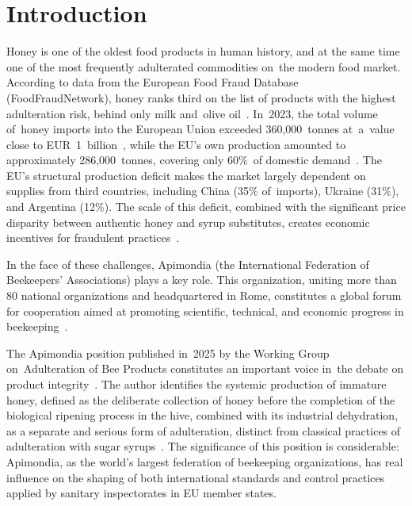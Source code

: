 \documentclass[foods,review,accept,pdftex,moreauthors]{Definitions/mdpi}
\begin{document}
\nolinenumbers


\section{Introduction}

Honey is one of the oldest food products in human history, and at
the same time one of the most frequently adulterated commodities
on~the modern food market. According to data from the European Food
Fraud Database (FoodFraudNetwork), honey ranks third on the list of
products with the highest adulteration risk, behind only milk
and~olive oil~\cite{apimondia_fraud_v2}. In~2023, the total volume
of~honey imports into the European Union exceeded 360,000~tonnes
at~a~value close to EUR~1~billion~\cite{cbi2024}, while the EU's own
production amounted to approximately 286,000~tonnes, covering
only 60\%~of domestic demand~\cite{pollinatorhub2025}.
The EU's structural production deficit makes the market largely
dependent on supplies from third countries, including China (35\%
of~imports), Ukraine (31\%), and Argentina (12\%).
The scale of this deficit, combined with the significant price
disparity between authentic honey and syrup substitutes, creates
economic incentives for fraudulent practices~\cite{apimondia_fraud_v2}.

In the face of these challenges, Apimondia (the International
Federation of Beekeepers' Associations) plays a key role. This
organization, uniting more than 80 national organizations and
headquartered in Rome, constitutes a global forum for cooperation
aimed at promoting scientific, technical, and economic progress
in beekeeping~\cite{apimondia_web}.

The Apimondia position published in~2025 by the Working Group
on~Adulteration of Bee Products constitutes an important voice
in~the debate on product integrity~\cite{garcia2025}.
The author identifies the systemic production of immature honey,
defined as the deliberate collection of honey before the completion
of the biological ripening process in the hive, combined with its
industrial dehydration, as a separate and serious form of adulteration,
distinct from classical practices of adulteration with sugar
syrups~\cite{garcia2025}.
The significance of this position is considerable: Apimondia, as the
world's largest federation of beekeeping organizations, has real
influence on the shaping of both international standards and control
practices applied by sanitary inspectorates in EU member states.
\end{document}
